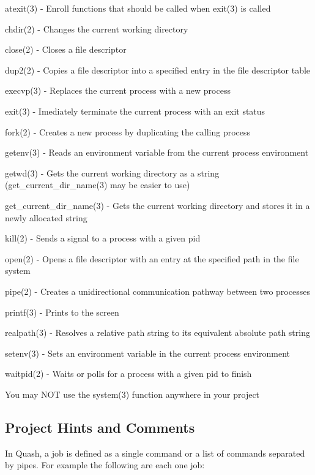 \begin{DoxyItemize}
\item atexit(3) -\/ Enroll functions that should be called when exit(3) is called
\item chdir(2) -\/ Changes the current working directory
\item close(2) -\/ Closes a file descriptor
\item dup2(2) -\/ Copies a file descriptor into a specified entry in the file descriptor table
\item execvp(3) -\/ Replaces the current process with a new process
\item exit(3) -\/ Imediately terminate the current process with an exit status
\item fork(2) -\/ Creates a new process by duplicating the calling process
\item getenv(3) -\/ Reads an environment variable from the current process environment
\item getwd(3) -\/ Gets the current working directory as a string (get\+\_\+current\+\_\+dir\+\_\+name(3) may be easier to use)
\item get\+\_\+current\+\_\+dir\+\_\+name(3) -\/ Gets the current working directory and stores it in a newly allocated string
\item kill(2) -\/ Sends a signal to a process with a given pid
\item open(2) -\/ Opens a file descriptor with an entry at the specified path in the file system
\item pipe(2) -\/ Creates a unidirectional communication pathway between two processes
\item printf(3) -\/ Prints to the screen
\item realpath(3) -\/ Resolves a relative path string to its equivalent absolute path string
\item setenv(3) -\/ Sets an environment variable in the current process environment
\item waitpid(2) -\/ Waits or polls for a process with a given pid to finish
\end{DoxyItemize}

You may N\+OT use the system(3) function anywhere in your project

\subsection*{Project Hints and Comments}

In Quash, a job is defined as a single command or a list of commands separated by pipes. For example the following are each one job\+:

